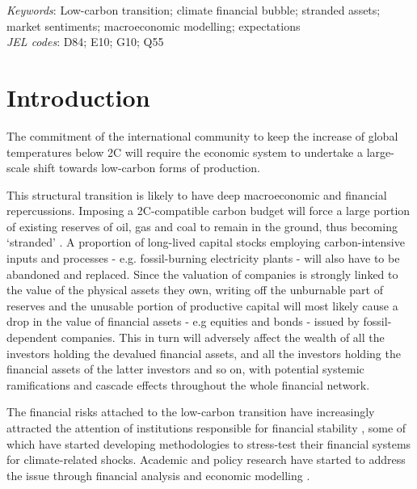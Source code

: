 \documentclass[authoryear]{article}
\begin{document}
\vspace{0.3cm}

\noindent \emph{Keywords}: Low-carbon transition; climate financial bubble; stranded assets; market sentiments; macroeconomic modelling; expectations\\
\emph{JEL codes}: D84; E10; G10; Q55


\newpage


\section{Introduction}
\label{sec:intro}


The commitment of the international community to keep the increase of global temperatures below 2\degree C \citep{unfccc2016} will require the economic system to undertake a large-scale shift towards low-carbon forms of production.

This structural transition is likely to have deep macroeconomic and financial repercussions. Imposing a 2\degree C-compatible carbon budget will force a large portion of existing reserves of oil, gas and coal to remain in the ground, thus becoming `stranded' \citep{Meinshausen2009, CarbonTracker2013, McGlade2015}. A proportion of long-lived capital stocks employing carbon-intensive inputs and processes - e.g. fossil-burning electricity plants - will also have to be abandoned and replaced. Since the valuation of companies is strongly linked to the value of the physical assets they own, writing off the unburnable part of reserves and the unusable portion of productive capital will most likely cause a drop in the value of financial assets - e.g equities and bonds - issued by fossil-dependent companies. This in turn will adversely affect the wealth of all the investors holding the devalued financial assets, and all the investors holding the financial assets of the latter investors and so on, with potential systemic ramifications and cascade effects throughout the whole financial network. 

The financial risks attached to the low-carbon transition have increasingly attracted the attention of institutions responsible for financial stability \citep{Carney2015, Carney2016, DNB2016, ESRB2016, Batten2016}, some of which have started developing methodologies to stress-test their financial systems for climate-related shocks. Academic and policy research have started to address the issue through financial analysis and economic modelling \citep{Battiston2016, Comerford2015, CISL2015, Dietz2016}.
\end{document}
